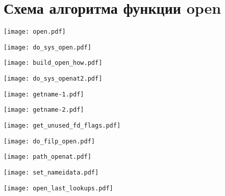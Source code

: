 \chapter{Схема алгоритма функции open}

\begin{center}
	\texttt{[image: open.pdf]}
\end{center}

\begin{center}
	\texttt{[image: do\_sys\_open.pdf]}
\end{center}

\begin{center}
	\texttt{[image: build\_open\_how.pdf]}
\end{center}

\begin{center}
	\texttt{[image: do\_sys\_openat2.pdf]}
\end{center}

\begin{center}
	\texttt{[image: getname-1.pdf]}
\end{center}

\begin{center}
	\texttt{[image: getname-2.pdf]}
\end{center}

\begin{center}
	\texttt{[image: get\_unused\_fd\_flags.pdf]}
\end{center}

\begin{center}
	\texttt{[image: do\_filp\_open.pdf]}
\end{center}

\begin{center}
	\texttt{[image: path\_openat.pdf]}
\end{center}

\begin{center}
	\texttt{[image: set\_nameidata.pdf]}
\end{center}

\begin{center}
	\texttt{[image: open\_last\_lookups.pdf]}
\end{center}
